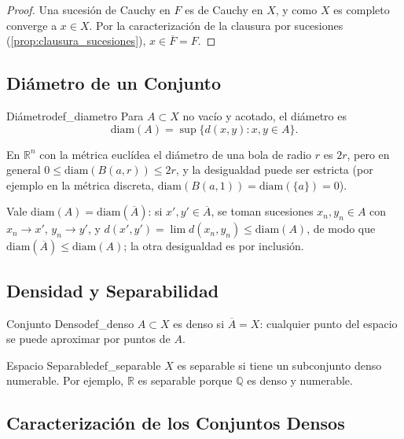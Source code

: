 \documentclass[11pt, a4paper]{article}
\begin{document}
\begin{proof}
Una sucesión de Cauchy en $F$ es de Cauchy en $X$, y como $X$ es completo converge a $x \in X$.
Por la caracterización de la clausura por sucesiones (\ref{prop:clausura_sucesiones}),
$x \in \overline{F} = F$.
\end{proof}

\subsection{Diámetro de un Conjunto}

\begin{definicion}{Diámetro}{def_diametro}
Para $A \subset X$ no vacío y acotado, el diámetro es
$$ \mathrm{diam}(A) = \sup \{ d(x, y) : x, y \in A \}. $$
\end{definicion}

\obs En $\mathbb{R}^n$ con la métrica euclídea el diámetro de una bola de radio $r$ es $2r$,
pero en general $0 \le \mathrm{diam}(B(a, r)) \le 2r$, y la desigualdad puede ser estricta (por
ejemplo en la métrica discreta, $\mathrm{diam}(B(a, 1)) = \mathrm{diam}(\{a\}) = 0$).

\obs Vale $\mathrm{diam}(A) = \mathrm{diam}(\overline{A})$: si $x', y' \in \overline{A}$, se toman
sucesiones $x_n, y_n \in A$ con $x_n \to x'$, $y_n \to y'$, y
$d(x', y') = \lim d(x_n, y_n) \le \mathrm{diam}(A)$, de modo que
$\mathrm{diam}(\overline{A}) \le \mathrm{diam}(A)$; la otra desigualdad es por inclusión.

\subsection{Densidad y Separabilidad}

\begin{definicion}{Conjunto Denso}{def_denso}
$A \subset X$ es denso si $\overline{A} = X$: cualquier punto del espacio se puede aproximar por
puntos de $A$.
\end{definicion}

\begin{definicion}{Espacio Separable}{def_separable}
$X$ es separable si tiene un subconjunto denso numerable. Por ejemplo, $\mathbb{R}$ es separable
porque $\mathbb{Q}$ es denso y numerable.
\end{definicion}

\subsection{Caracterización de los Conjuntos Densos}
\end{document}
